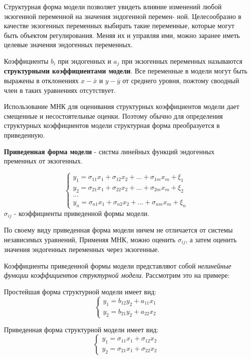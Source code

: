 \documentclass[aps,%
12pt,%
final,%
oneside,
onecolumn,%
musixtex, %
superscriptaddress,%
centertags]{article} %
\begin{document}
Структурная форма модели позволяет увидеть влияние изменений любой экзогенной переменной на значения эндогенной перемен-
ной. Целесообразно в качестве экзогенных переменных выбирать такие переменные, которые могут быть объектом регулирования. Меняя их и управляя ими, можно заранее иметь целевые значения эндогенных переменных.

Коэффициенты $b_i$ при эндогенных и $a_j$ при экзогенных переменных называются \textbf{структурными коэффициентами модели}. Все переменные в модели могут быть выражены в отклонениях $x-\bar{x}$ и $y-\bar{y}$ от среднего уровня, пожтому своодный член в таких уравнениях отсутствует.

Использование МНК для оценивания структурных коэффициентов модели дает смещенные и несостоятельные оценки. Поэтому
обычно для определения структурных коэффициентов модели структурная форма преобразуется в приведенную.

\textbf{Приведенная форма модели} - систма линейных функций эндогенных пременных от экзогенных.

$$\left \{
\begin{matrix}
	y_1 = \sigma_{11}x_1 + \sigma_{12}x_2 + \ldots + \sigma_{1m}x_m + \xi_1 \\[0.3cm]
	y_2 =\sigma_{21}x_1 + \sigma_{22}x_2 + \ldots + \sigma_{2m}x_m + \xi_2  \\[0.3cm]
	\ldots \\
	y_n = \sigma_{n1}x_1 + \sigma_{n2}x_2 + \ldots + \sigma_{nm}x_m + \xi_n 
\end{matrix}
\right.
$$
$\sigma_{ij}$ - коэффициенты приведенной формы модели.

По своему виду приведенная форма модели ничем не отличается от системы независимых уравнений, Применяя МНК, можно оценить $\sigma_{ij}$, а затем оценить значения эндогенных переменных через экзогенные.

Коэффициенты приведенной формы модели представляют собой \textit{нелинейные функции коэффициентов структурной модели}. Рассмотрим это на примере:

Простейшая форма структурной модели имеет вид:
$$\left \{
\begin{matrix}
	y_1 = b_{12}y_2 + a_{11}x_1\\
	y_2 = b_{21}y_2 + a_{22}x_2
\end{matrix}
\right.
$$

Приведенная форма структурной модели имеет вид:
$$\left \{
\begin{matrix}
	y_1 = \sigma_{11}x_1 + \sigma_{12}x_2\\
	y_2 = \sigma_{21}x_1 + \sigma_{22}x_2
\end{matrix}
\right.
$$
\end{document}
